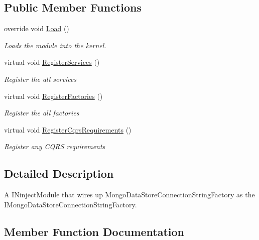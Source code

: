\subsection*{Public Member Functions}
\begin{DoxyCompactItemize}
\item 
override void \hyperlink{classCqrs_1_1Ninject_1_1Mongo_1_1Configuration_1_1MongoModule_a2c1c276eb2820eede67cf834e430fa19_a2c1c276eb2820eede67cf834e430fa19}{Load} ()
\begin{DoxyCompactList}\small\item\em Loads the module into the kernel. \end{DoxyCompactList}\item 
virtual void \hyperlink{classCqrs_1_1Ninject_1_1Mongo_1_1Configuration_1_1MongoModule_a6d0edb4e718b9588671382dd2e183ebc_a6d0edb4e718b9588671382dd2e183ebc}{Register\+Services} ()
\begin{DoxyCompactList}\small\item\em Register the all services \end{DoxyCompactList}\item 
virtual void \hyperlink{classCqrs_1_1Ninject_1_1Mongo_1_1Configuration_1_1MongoModule_a052d4cd960c3c5da037a04e43424c9c8_a052d4cd960c3c5da037a04e43424c9c8}{Register\+Factories} ()
\begin{DoxyCompactList}\small\item\em Register the all factories \end{DoxyCompactList}\item 
virtual void \hyperlink{classCqrs_1_1Ninject_1_1Mongo_1_1Configuration_1_1MongoModule_a2753759a99ea08d8a0ef22ed96e52bdb_a2753759a99ea08d8a0ef22ed96e52bdb}{Register\+Cqrs\+Requirements} ()
\begin{DoxyCompactList}\small\item\em Register any C\+Q\+RS requirements \end{DoxyCompactList}\end{DoxyCompactItemize}


\subsection{Detailed Description}
A I\+Ninject\+Module that wires up Mongo\+Data\+Store\+Connection\+String\+Factory as the I\+Mongo\+Data\+Store\+Connection\+String\+Factory. 



\subsection{Member Function Documentation}
\mbox{\label{classCqrs_1_1Ninject_1_1Mongo_1_1Configuration_1_1MongoModule_a2c1c276eb2820eede67cf834e430fa19_a2c1c276eb2820eede67cf834e430fa19}} 
